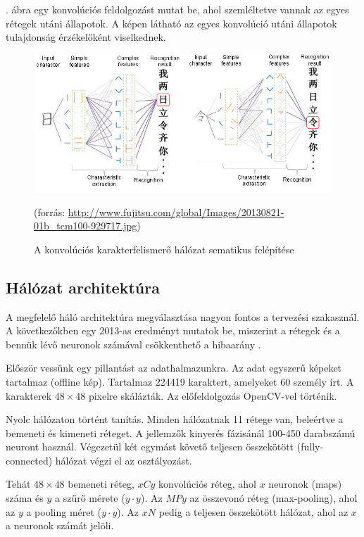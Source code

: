. ábra egy konvolúciós feldolgozást mutat be, ahol szemléltetve vannak az egyes rétegek utáni állapotok. A képen látható az egyes konvolúció utáni állapotok tulajdonság érzékelőként viselkednek.

\begin{figure}[h]
\centering
\includegraphics[scale=0.65]{images/CNN_CCR_working}
\caption{A konvolúciós karakterfelismerő hálózat sematikus felépítése}
(forrás: \url{http://www.fujitsu.com/global/Images/20130821-01b_tcm100-929717.jpg})
\label{fig:CNN_CCR_working}
\end{figure}

\subsection{Hálózat architektúra}

A megfelelő háló architektúra megválasztása nagyon fontos a tervezési szakasznál. A következőkben egy 2013-as eredményt mutatok be, miszerint a rétegek és a bennük lévő neuronok számával csökkenthető a hibaarány \cite{cirecsan2015multi}.

Először vessünk egy pillantást az adathalmazunkra. Az adat egyszerű képeket tartalmaz (offline kép). Tartalmaz 224419 karaktert, amelyeket 60 személy írt. A karakterek $48 \times 48$ pixelre skálázták. Az előfeldolgozás OpenCV-vel történik.

Nyolc hálózaton történt tanítás. Minden hálózatnak 11 rétege van, beleértve a bemeneti és kimeneti réteget. A jellemzők kinyerés fázisánál 100-450 darabszámú neuront használ. Végezetül két egymást követő teljesen összekötött (fully-connected) hálózat végzi el az osztályozást.

Tehát $48 \times 48$ bemeneti réteg, $xCy$ konvolúciós réteg, ahol $x$ neuronok (maps) száma és $y$ a szűrő mérete ($y \cdot y$). Az $MPy$ az összevonó réteg (max-pooling), ahol az $y$ a pooling méret ($y \cdot y$). Az $xN$ pedig a teljesen összekötött hálózat, ahol az $x$ a neuronok számát jelöli.

